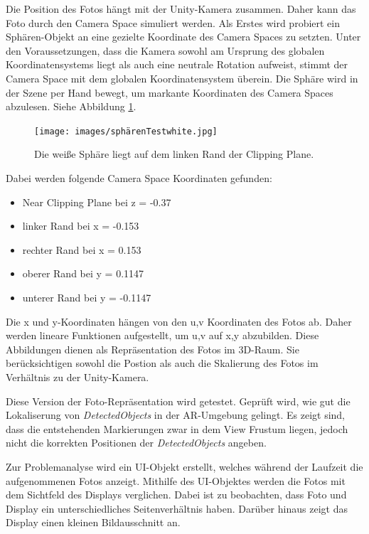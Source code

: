 Die Position des Fotos hängt mit der Unity-Kamera zusammen. Daher kann das Foto durch den Camera Space simuliert werden. Als Erstes wird probiert ein Sphären-Objekt an eine gezielte Koordinate des Camera Spaces zu setzten. Unter den Voraussetzungen, dass die Kamera sowohl am Ursprung des globalen Koordinatensystems liegt als auch eine neutrale Rotation aufweist, stimmt der Camera Space mit dem globalen Koordinatensystem überein. Die Sphäre wird in der Szene per Hand bewegt, um markante Koordinaten des Camera Spaces abzulesen. Siehe Abbildung \ref{illustration:speretest}.

\begin{figure}[H]
	\centering
	\texttt{[image: images/sphärenTestwhite.jpg]}
	\caption[Ränder der Near Clipping Plane in Unity finden]{Die weiße Sphäre liegt auf dem linken Rand der Clipping Plane.}
	\label{illustration:speretest}
\end{figure}

Dabei werden folgende Camera Space Koordinaten gefunden:
\begin{itemize}
	\item Near Clipping Plane bei z = -0.37
	\item linker Rand bei x = -0.153
	\item rechter Rand bei x = 0.153
	\item oberer Rand bei y = 0.1147
	\item unterer Rand bei y = -0.1147
\end{itemize}

Die x und y-Koordinaten hängen von den u,v Koordinaten des Fotos ab. Daher werden lineare Funktionen aufgestellt, um u,v auf x,y abzubilden. Diese Abbildungen dienen als Repräsentation des Fotos im 3D-Raum. Sie berücksichtigen sowohl die Postion als auch die Skalierung des Fotos im Verhältnis zu der Unity-Kamera.

Diese Version der Foto-Repräsentation wird getestet. Geprüft wird, wie gut die Lokaliserung von \textit{DetectedObjects} in der AR-Umgebung gelingt. Es zeigt sind, dass die entstehenden Markierungen zwar in dem View Frustum liegen, jedoch nicht die korrekten Positionen der \textit{DetectedObjects} angeben.

Zur Problemanalyse wird ein UI-Objekt erstellt, welches während der Laufzeit die aufgenommenen Fotos anzeigt. Mithilfe des UI-Objektes werden die Fotos mit dem Sichtfeld des Displays verglichen. Dabei ist zu beobachten, dass Foto und Display ein unterschiedliches Seitenverhältnis haben. Darüber hinaus zeigt das Display einen kleinen Bildausschnitt an.

